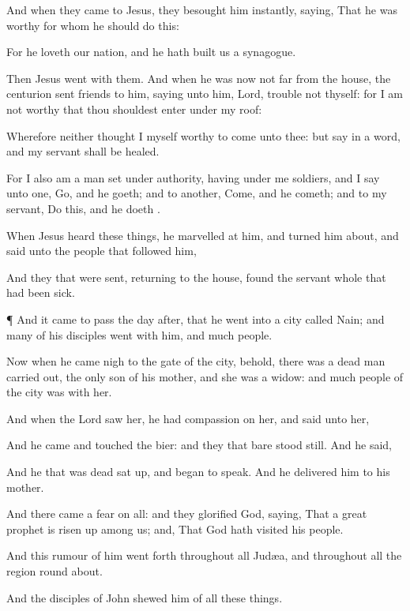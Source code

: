 {And when they
came
to
Jesus, they
besought
him
instantly,
saying,
That he
was
worthy for
whom he should
do
this:

For he
loveth
our
nation,
and
he hath
built
us a
synagogue.

Then
Jesus
went
with
them.
And when
he
was
now
not
far
from the
house, the
centurion
sent
friends
to
him,
saying unto
him,
Lord,
trouble
not
thyself:
for I
am
not
worthy
that thou shouldest
enter
under
my
roof:

Wherefore
neither thought
I
myself
worthy to
come
unto
thee:
but
say in a
word,
and
my
servant shall be
healed.

For
I
also
am a
man
set
under
authority,
having
under
me
soldiers,
and I
say unto
one,
Go,
and he
goeth;
and to
another,
Come,
and he
cometh;
and to
my
servant,
Do
this,
and he
doeth
{}.

When
Jesus
heard these
things, he
marvelled at
him,
and turned him
about, and
said unto the
people that
followed
him,
{}

And they that were
sent,
returning
to the
house,
found the
servant
whole that had been
sick.


\par }{\PP {}¶
And it came to
pass the day
after, that he
went
into a
city
called
Nain;
and
many of
his
disciples went
with
him,
and
much
people.

Now
when he came
nigh to the
gate of the
city,
behold, there
was a dead
man carried
out, the
only
son of
his
mother,
and
she
was a
widow:
and
much
people of the
city
was
with
her.

And
when the
Lord
saw
her, he had
compassion
on
her,
and
said unto
her,
{}

And he
came and
touched the
bier:
and they that
bare
{} stood
still.
And he
said,
{}

And he that was
dead sat
up,
and
began to
speak.
And he
delivered
him to
his
mother.

And there
came a
fear on
all:
and they
glorified
God,
saying,
That a
great
prophet is risen
up
among
us;
and,
That
God hath
visited
his
people.

And
this
rumour
of
him went
forth
throughout
all
Judæa,
and
throughout
all the region round
about.

And the
disciples of
John
shewed
him
of
all these
things.


}
